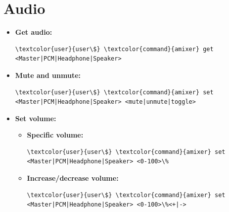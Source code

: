 \documentclass[10pt, a4paper, onecolumn, oneside, titlepage, openany]{book}
\begin{document}
\section{Audio}
\begin{itemize}
    \item \textbf{Get audio:}
\begin{Verbatim}[commandchars=\\\{\}]
\textcolor{user}{user\$} \textcolor{command}{amixer} get <Master|PCM|Headphone|Speaker>
\end{Verbatim}
    \item \textbf{Mute and unmute:}
\begin{Verbatim}[commandchars=\\\{\}]
\textcolor{user}{user\$} \textcolor{command}{amixer} set <Master|PCM|Headphone|Speaker> <mute|unmute|toggle>
\end{Verbatim}
    \item \textbf{Set volume:}
    \begin{itemize}
        \item \textbf{Specific volume:}
\begin{Verbatim}[commandchars=\\\{\}]
\textcolor{user}{user\$} \textcolor{command}{amixer} set <Master|PCM|Headphone|Speaker> <0-100>\%
\end{Verbatim}        
        \item \textbf{Increase/decrease volume:}
\begin{Verbatim}[commandchars=\\\{\}]
\textcolor{user}{user\$} \textcolor{command}{amixer} set <Master|PCM|Headphone|Speaker> <0-100>\%<+|->
\end{Verbatim}   
    \end{itemize}
\end{itemize}
\end{document}
